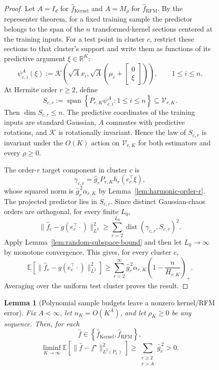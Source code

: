 \documentclass{article}
\newtheorem{lemma}[lemma]{Lemma}
\begin{document}
\begin{figure}
\begin{proof}
Let $A=I_d$ for $\widehat f_{\mathrm{Kernel}}$ and $A=M_\rho$ for
$\widehat f_{\mathrm{RFM}}$.
By the representer theorem, for a fixed training sample the predictor belongs
to the span of the $n$ transformed-kernel sections centered at the training
inputs. For a test point in cluster $c$, restrict these sections to that
cluster's support and write them as functions of its predictive argument
$\xi\in\mathbb R^K$:
\[
    \psi_{c,i}^{A}(\xi)
    :=\mathcal K\!\left(
        \sqrt A x_i,
        \sqrt A
        \left(\mu_c+\begin{bmatrix}0\\\xi\end{bmatrix}\right)
      \right),
    \qquad 1\leq i\leq n.
\]
At Hermite order $r\geq2$, define
\[
    S_{c,r}
    :=\operatorname{span}\left\{
        P_{r,K}\psi_{c,i}^{A}:1\leq i\leq n
      \right\}
    \subseteq\mathcal V_{r,K}.
\]
Then $\dim S_{c,r}\leq n$. The predictive coordinates of the training inputs
are standard Gaussian, $A$ commutes with predictive rotations, and
$\mathcal K$ is rotationally invariant. Hence the law of $S_{c,r}$ is
invariant under the $O(K)$ action on $\mathcal V_{r,K}$ for both estimators
and every $\rho\geq0$.

The order-$r$ target component in cluster $c$ is
\[
    \gamma_{c,r}
    =\widehat g_rP_{r,K}h_r(e_c^\top\xi),
\]
whose squared norm is $\widehat g_r^{\,2}\alpha_{r,K}$ by
Lemma~\ref{lem:harmonic-order-r}. The projected predictor lies in $S_{c,r}$.
Since distinct Gaussian-chaos orders are orthogonal, for every finite $L_0$,
\[
    \|\widehat f_c-g(e_c^\top\!\cdot)\|_{L^2}^2
    \geq
    \sum_{r=2}^{L_0}\operatorname{dist}(\gamma_{c,r},S_{c,r})^2.
\]
Apply Lemma~\ref{lem:random-subspace-bound} and then let $L_0\to\infty$ by
monotone convergence. This gives, for every cluster $c$,
\[
    \mathbb E\left[
        \|\widehat f_c-g(e_c^\top\!\cdot)\|_{L^2}^2
    \right]
    \geq
    \sum_{r=2}^\infty
    \widehat g_r^{\,2}\alpha_{r,K}
    \left(1-\frac{n}{H_{r,K}}\right)_+.
\]
Averaging over the uniform test cluster proves the result.
\end{proof}

\begin{lemma}[Polynomial sample budgets leave a nonzero kernel/RFM error]
\label{lem:polynomial-kernel-rfm-failure}
Fix $A<\infty$, let $n_K=O(K^A)$, and let $\rho_K\geq0$ be any sequence.
Then, for each
\[
    \widehat f\in
    \left\{\widehat f_{\mathrm{Kernel}},\widehat f_{\mathrm{RFM}}\right\},
\]
\[
    \liminf_{K\to\infty}
    \mathbb E\left[
        \|\widehat f-f^\star\|_{L^2(P_x)}^2
    \right]
    \geq
    \sum_{\substack{r\geq2\\r>A}}\widehat g_r^{\,2}>0.
\]
\end{lemma}


\end{figure}
\end{document}
